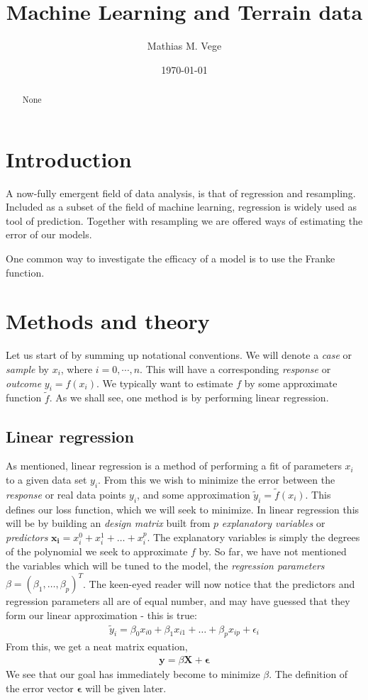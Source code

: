 \documentclass[11pt]{article}
\title{Machine Learning and Terrain data}
\author{Mathias M. Vege}
\date{\today}
\begin{document}
\maketitle

\begin{abstract}
None
\end{abstract}

\tableofcontents

\section{Introduction}
A now-fully emergent field of data analysis, is that of regression and resampling. Included as a subset of the field of machine learning, regression is widely used as tool of prediction. Together with resampling we are offered ways of estimating the error of our models.

One common way to investigate the efficacy of a model is to use the Franke function\cite{franke1979critical}.

\section{Methods and theory}
Let us start of by summing up notational conventions. We will denote a \textit{case} or \textit{sample} by $x_i$, where $i=0,\cdots,n$. This will have a corresponding \textit{response} or \textit{outcome} $y_i = f(x_i)$. We typically want to estimate $f$ by some approximate function $\tilde{f}$. As we shall see, one method is by performing linear regression.

\subsection{Linear regression}
As mentioned, linear regression is a method of performing a fit of parameters $x_i$ to a given data set $y_i$. From this we wish to minimize the error between the \textit{response} or real data points $y_i$, and some approximation $\tilde{y}_i=\tilde{f}(x_i)$. This defines our loss function, which we will seek to minimize. In linear regression this will be by building an \textit{design matrix} built from $p$ \textit{explanatory variables} or \textit{predictors} $\bm{x_i}=x_i^0+x_i^1+\dots+x_i^p$. The explanatory variables is simply the degrees of the polynomial we seek to approximate $f$ by. So far, we have not mentioned the variables which will be tuned to the model, the \textit{regression parameters} $\beta=(\beta_1,\dots,\beta_p)^T$. The keen-eyed reader will now notice that the predictors and regression parameters all are of equal number, and may have guessed that they form our linear approximation - this is true:
\begin{align*}
    \tilde{y}_i = \beta_0 x_{i0} + \beta_1 x_{i1} + \dots + \beta_p x_{ip} + \epsilon_i
\end{align*}
From this, we get a neat matrix equation,
\begin{align}
    \bm{y} = \beta \bm{X} + \bm{\epsilon}
    \label{eq:linreg_eq}
\end{align}
We see that our goal has immediately become to minimize $\beta$. The definition of the error vector $\bm{\epsilon}$ will be given later.
\end{document}
